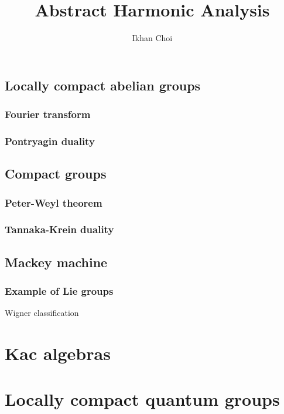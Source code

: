 \documentclass{../note}
\begin{document}
\title{Abstract Harmonic Analysis}
\author{Ikhan Choi}
\maketitle
\tableofcontents

\part{}

\chapter{Locally compact abelian groups}
\section{Fourier transform}
\section{Pontryagin duality}

\chapter{Compact groups}
\section{Peter-Weyl theorem}
\section{Tannaka-Krein duality}

\chapter{Mackey machine}
\section{Example of Lie groups}
Wigner classification

\part{Kac algebras}



\part{Locally compact quantum groups}
\end{document}
